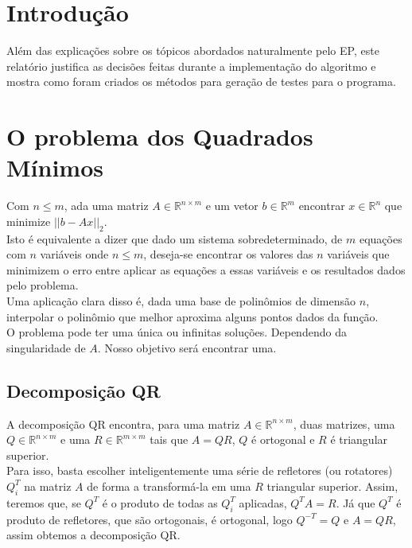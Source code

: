 \documentclass[
10pt, %
a4paper, %
oneside, %
headinclude,footinclude, %
BCOR5mm, %
]{scrartcl}
\begin{document}

\newpage %

\section{Introdução}
Além das explicações sobre os tópicos abordados naturalmente pelo EP, este relatório justifica as decisões feitas durante a implementação do algoritmo e mostra como foram criados os métodos para geração de testes para o programa.

\section{O problema dos Quadrados Mínimos}
Com $n \leq m$, ada uma matriz $A \in \mathbb{R}^{n \times m}$ e um vetor $b \in \mathbb{R}^{m}$ encontrar $x \in \mathbb{R}^{n}$ que minimize $||b-Ax||_2$. \\
Isto é equivalente a dizer que dado um sistema sobredeterminado, de $m$ equações com $n$ variáveis onde $n \leq m$, deseja-se encontrar os valores das $n$ variáveis que minimizem o erro entre aplicar as equações a essas variáveis e os resultados dados pelo problema. \\
Uma aplicação clara disso é, dada uma base de polinômios de dimensão $n$, interpolar o polinômio que melhor aproxima alguns pontos dados da função. \\
O problema pode ter uma única ou infinitas soluções. Dependendo da singularidade de $A$. Nosso objetivo será encontrar uma.

\subsection{Decomposição QR}
A decomposição QR encontra, para uma matriz $A \in \mathbb{R}^{n \times m}$, duas matrizes, uma $Q \in \mathbb{R}^{n \times m}$ e uma $R \in \mathbb{R}^{m \times m}$ tais que $A = QR$, $Q$ é ortogonal e $R$ é triangular superior. \\
Para isso, basta escolher inteligentemente uma série de refletores (ou rotatores) $Q^T_i$ na matriz $A$ de forma a transformá-la em uma $R$ triangular superior. Assim, teremos que, se $Q^T$ é o produto de todas as $Q^T_i$ aplicadas, $Q^TA = R$. Já que $Q^T$ é produto de refletores, que são ortogonais, é ortogonal, logo $Q^{-T} = Q$ e $A = QR$, assim obtemos a decomposição QR. \\
\end{document}
